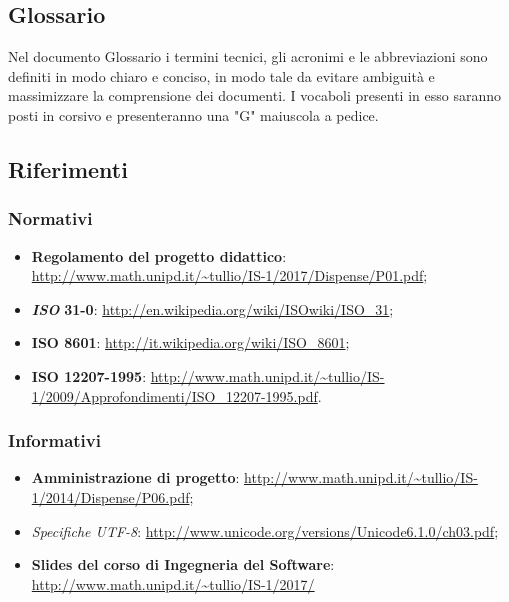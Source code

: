 \subsection{Glossario}
Nel documento Glossario i termini tecnici, gli acronimi e le abbreviazioni sono definiti in modo chiaro e conciso, in modo tale da evitare ambiguità e massimizzare la comprensione dei documenti.
\newline I vocaboli presenti in esso saranno posti in corsivo e presenteranno una "G" maiuscola a pedice.
\subsection{Riferimenti}
\subsubsection{Normativi}
\begin{itemize}
	\item
	\textbf{Regolamento del progetto didattico}:
	\url{http://www.math.unipd.it/~tullio/IS-1/2017/Dispense/P01.pdf};
	\item
	\textbf{\textit{ISO}} \textbf{31-0}: \url{http://en.wikipedia.org/wiki/ISOwiki/ISO\_31};
	\item
	\textbf{ISO 8601}: \url{http://it.wikipedia.org/wiki/ISO\_8601};
	\item
	\textbf{ISO 12207-1995}: \url{http://www.math.unipd.it/~tullio/IS-1/2009/Approfondimenti/ISO\_12207-1995.pdf}.
\end{itemize}
\subsubsection{Informativi}
\begin{itemize}
	\item \textbf{Amministrazione di progetto}: \url{http://www.math.unipd.it/~tullio/IS-1/2014/Dispense/P06.pdf};
	\item \textit{Specifiche \textit{UTF-8}}: \url{http://www.unicode.org/versions/Unicode6.1.0/ch03.pdf};
	\item \textbf{Slides del corso di Ingegneria del Software}:
	\url{http://www.math.unipd.it/~tullio/IS-1/2017/}
\end{itemize}
